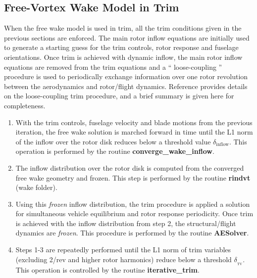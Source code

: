 \subsection{\textbf{Free-Vortex Wake Model in Trim}}
When the free wake model is used in trim, all the trim conditions given in the previous sections are enforced. The main rotor inflow equations are initially used to generate a starting guess for the trim controls, rotor response and fuselage orientations. Once trim is achieved with dynamic inflow, the main rotor inflow equations are removed from the trim equations and a `` loose-coupling '' procedure is used to periodically exchange information over one rotor revolution between the aerodynamics and rotor/flight dynamics. Reference \cite{Alfred} provides details on the loose-coupling trim procedure, and a brief summary is given here for completeness.

\begin{enumerate}
\item With the trim controls, fuselage velocity and blade motions from the previous iteration, the free wake solution is marched forward in time until the L1 norm of the inflow over the rotor disk reduces below a threshold value $\delta_\textrm{inflow}$. This operation is performed by the routine \textbf{converge\_wake\_inflow}.
\item The inflow distribution over the rotor disk is computed from the converged free wake geometry and frozen. This step is performed by the routine \textbf{rindvt} (wake folder). 
\item Using this \textit{frozen} inflow distribution, the trim procedure is applied a solution for simultaneous vehicle equilibrium and rotor response periodicity. Once trim is achieved with the inflow distribution from step 2, the structural/flight dynamics are \emph{frozen}. This procedure is performed by the routine \textbf{AESolver}.
\item Steps 1-3 are repeatedly performed until the L1 norm of trim variables (excluding 2/rev and higher rotor harmonics) reduce below a threshold $\delta_{_\textrm{TV}}$. This operation is controlled by the routine \textbf{iterative\_trim}.
\end{enumerate}

